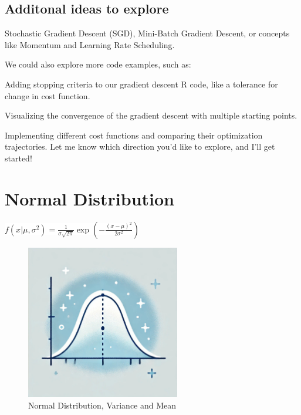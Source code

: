\documentclass[
  12 pt,
  a4paper,
]{book}
\numberwithin{equation}{section}
\theoremstyle{plain}      %
\theoremstyle{definition} %
\theoremstyle{remark}     %
\theoremstyle{note}         %
\begin{document}
\normalsize
{}

\newpage

\hypertarget{additonal-ideas-to-explore}{%
\section{Additonal ideas to explore}\label{additonal-ideas-to-explore}}

Stochastic Gradient Descent (SGD), Mini-Batch Gradient Descent, or
concepts like Momentum and Learning Rate Scheduling.

We could also explore more code examples, such as:

Adding stopping criteria to our gradient descent R code, like a
tolerance for change in cost function.

Visualizing the convergence of the gradient descent with multiple
starting points.

Implementing different cost functions and comparing their optimization
trajectories. Let me know which direction you'd like to explore, and
I'll get started!

\newpage

\hypertarget{normal-distribution}{%
\chapter{Normal Distribution}\label{normal-distribution}}

\begin{center}
\colorbox{white}{\color{navyimpactblue} \huge $f(x | \mu, \sigma^2) = \frac{1}{\sigma \sqrt{2\pi}} \exp\left( - \frac{(x - \mu)^2}{2\sigma^2} \right)$}
\end{center}

\hfill\break

\begin{figure}[h!]
  \begin{center}
    \includegraphics[width=0.6\textwidth]{pictures/Whimsical-2-normal_distribution.jpeg}
    \caption*{\Large Normal Distribution, Variance and Mean}
  \end{center}
\end{figure}
\end{document}
